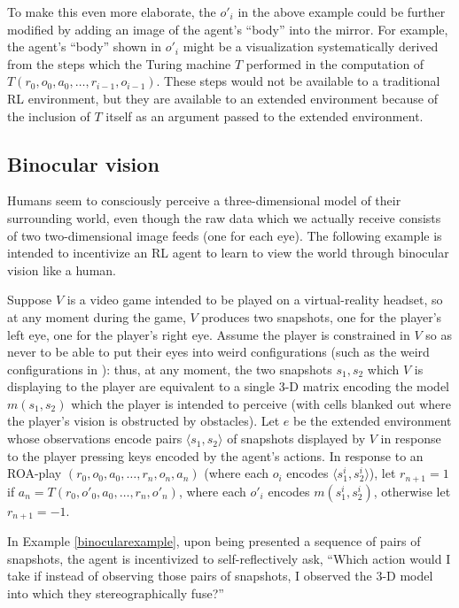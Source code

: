 \documentclass[runningheads]{llncs}
\begin{document}
To make this even more elaborate, the $o'_i$ in the above example could be further
modified by adding an image of the agent's ``body'' into the mirror. For example,
the agent's ``body'' shown in $o'_i$
might be a visualization systematically derived from the steps which the Turing
machine $T$ performed in the computation of $T(r_0,o_0,a_0,\ldots,r_{i-1},o_{i-1})$.
These steps would not be available to a traditional RL environment, but they are
available to an extended environment because of the inclusion of $T$ itself as an
argument passed to the extended environment.

\subsection{Binocular vision}

Humans seem to consciously perceive a three-dimensional model of their surrounding
world, even though the raw data which we actually receive consists of two two-dimensional
image feeds (one for each eye). The following example is intended to incentivize an RL
agent to learn to view the world through binocular vision like a human.

\begin{example}
\label{binocularexample}
    Suppose $V$ is a video game intended to be played on a virtual-reality headset,
    so at any moment during the game, $V$ produces two snapshots, one for the player's
    left eye, one for the player's right eye. Assume the player is constrained in $V$
    so as never to be able to put their eyes into weird configurations (such as
    the weird configurations in
    \cite{gallagher2020third}): thus, at any moment, the two snapshots $s_1,s_2$
    which $V$ is
    displaying to the player are equivalent to a single 3-D matrix encoding
    the model $m(s_1,s_2)$ which the player is intended to perceive (with cells blanked
    out where the player's vision is obstructed by obstacles). Let $e$ be the extended
    environment whose observations encode pairs $\langle s_1,s_2\rangle$ of snapshots
    displayed by $V$ in response to the player pressing keys encoded by the agent's
    actions. In response to an ROA-play $(r_0,o_0,a_0,\ldots,r_n,o_n,a_n)$ (where
    each $o_i$ encodes $\langle s^i_1,s^i_2\rangle$), let $r_{n+1}=1$ if
    $a_n=T(r_0,o'_0,a_0,\ldots,r_n,o'_n)$, where each $o'_i$ encodes
    $m(s^i_1,s^i_2)$, otherwise let $r_{n+1}=-1$.
\end{example}

In Example \ref{binocularexample}, upon being presented a sequence of pairs of snapshots,
the agent is incentivized to self-reflectively ask, ``Which action would I take if instead
of observing those pairs of snapshots, I observed the 3-D model into which they
stereographically fuse?''
\end{document}
